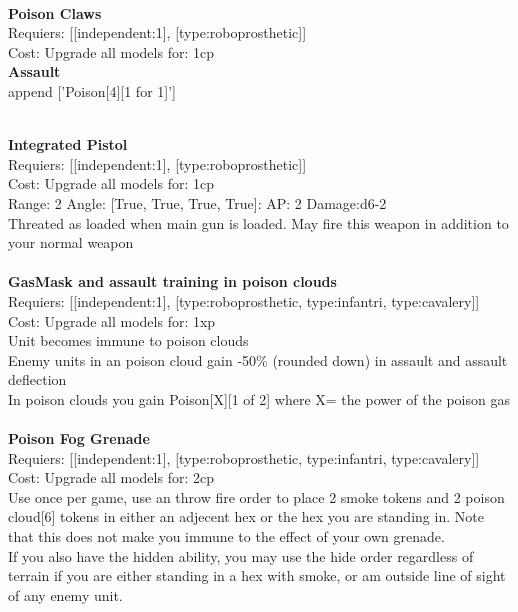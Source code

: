 \ \\
{\bf Poison Claws } \\

Requiers: [[independent:1], [type:roboprosthetic]] \\
Cost: Upgrade all models for: 1cp \\




{\bf Assault} \ \\

append ['Poison[4][1 for 1]']


\ \\
{\bf Integrated Pistol } \\

Requiers: [[independent:1], [type:roboprosthetic]] \\
Cost: Upgrade all models for: 1cp \\


Range: 2  Angle: [True, True, True, True]: AP: 2 Damage:d6-2 \\
Threated as loaded when main gun is loaded. May fire this weapon in addition to your normal weapon\\ 








\ \\
{\bf GasMask and assault training in poison clouds } \\

Requiers: [[independent:1], [type:roboprosthetic, type:infantri, type:cavalery]] \\
Cost: Upgrade all models for: 1xp \\
Unit becomes immune to poison clouds\\ 
Enemy units in an poison cloud gain -50\% (rounded down) in assault and assault deflection\\ 
In poison clouds you gain Poison[X][1 of 2] where X= the power of the poison gas\\ 









\ \\
{\bf Poison Fog Grenade } \\

Requiers: [[independent:1], [type:roboprosthetic, type:infantri, type:cavalery]] \\
Cost: Upgrade all models for: 2cp \\
Use once per game, use an throw fire order to place 2 smoke tokens and 2 poison cloud[6] tokens in either an adjecent hex or the hex you are standing in. Note that this does not make you immune to the effect of your own grenade.\\ 
If you also have the hidden ability, you may use the hide order regardless of terrain if you are either standing in a hex with smoke, or am outside line of sight of any enemy unit. \\ 








